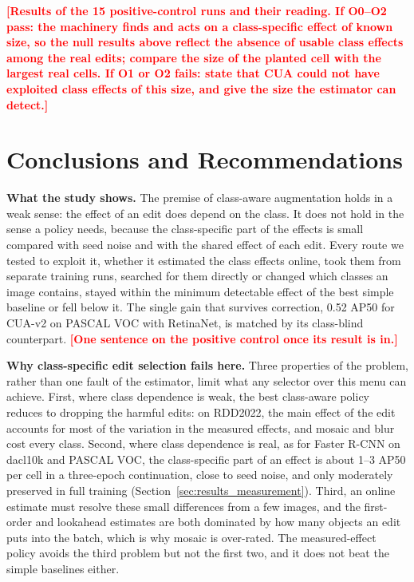 \documentclass[conference]{IEEEtran}
\newcommand{\todo}[1]{\textcolor{red}{\textbf{[#1]}}}
\begin{document}
\todo{Results of the 15 positive-control runs and their reading. If O0--O2 pass: the machinery finds and acts on a class-specific effect of known size, so the null results above reflect the absence of usable class effects among the real edits; compare the size of the planted cell with the largest real cells. If O1 or O2 fails: state that CUA could not have exploited class effects of this size, and give the size the estimator can detect.}


\section{Conclusions and Recommendations}
\label{sec:discussion}

\noindent\textbf{What the study shows.} The premise of class-aware augmentation holds in a weak sense: the effect of an edit does depend on the class. It does not hold in the sense a policy needs, because the class-specific part of the effects is small compared with seed noise and with the shared effect of each edit. Every route we tested to exploit it, whether it estimated the class effects online, took them from separate training runs, searched for them directly or changed which classes an image contains, stayed within the minimum detectable effect of the best simple baseline or fell below it. The single gain that survives correction, 0.52 AP50 for CUA-v2 on PASCAL VOC with RetinaNet, is matched by its class-blind counterpart. \todo{One sentence on the positive control once its result is in.}

\noindent\textbf{Why class-specific edit selection fails here.} Three properties of the problem, rather than one fault of the estimator, limit what any selector over this menu can achieve. First, where class dependence is weak, the best class-aware policy reduces to dropping the harmful edits: on RDD2022, the main effect of the edit accounts for most of the variation in the measured effects, and mosaic and blur cost every class. Second, where class dependence is real, as for Faster R-CNN on dacl10k and PASCAL VOC, the class-specific part of an effect is about 1--3 AP50 per cell in a three-epoch continuation, close to seed noise, and only moderately preserved in full training (Section~\ref{sec:results_measurement}). Third, an online estimate must resolve these small differences from a few images, and the first-order and lookahead estimates are both dominated by how many objects an edit puts into the batch, which is why mosaic is over-rated. The measured-effect policy avoids the third problem but not the first two, and it does not beat the simple baselines either.
\end{document}
